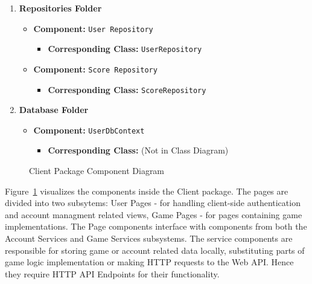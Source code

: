 \documentclass[11pt,a4paper]{article}
\newcommand{\inputdiagram}[1]{}
\begin{document}
\begin{enumerate}[label=\textbf{\arabic*.}, ref=\arabic*]
\begin{enumerate}[label=\textbf{\alph*.}, ref=\theenumi.\alph*]
\begin{itemize}
\begin{itemize}
                        \end{itemize}
                \end{itemize}
        \end{enumerate}
    \item \textbf{Repositories Folder}
        \begin{itemize}
            \item \textbf{Component:} \texttt{User Repository}
                \begin{itemize}
                    \item \textbf{Corresponding Class:} \texttt{UserRepository}
                \end{itemize}
            \item \textbf{Component:} \texttt{Score Repository}
                \begin{itemize}
                    \item \textbf{Corresponding Class:} \texttt{ScoreRepository}
                \end{itemize}
        \end{itemize}
    \item \textbf{Database Folder}
        \begin{itemize}
            \item \textbf{Component:} \texttt{UserDbContext}
                \begin{itemize}
                    \item \textbf{Corresponding Class:} (Not in Class Diagram)
                \end{itemize}
        \end{itemize}
\end{enumerate}

\begin{figure}[H]
    \centering
     \begin{adjustbox}{width=0.92\paperwidth,center}
         \inputdiagram{client_components.tex}
     \end{adjustbox}
    \caption{Client Package Component Diagram}
    \label{fig:client_components}
\end{figure}

Figure~\ref{fig:client_components} visualizes the components inside the Client package.  The pages
are divided into two subsytems: User Pages - for handling client-side
authentication and account managment related views, Game Pages - for pages
containing game implementations. The Page components interface with components
from both the Account Services and Game Services subsystems.  The service
components are responsible for storing game or account related data locally,
substituting parts of game logic implementation or making HTTP requests to
the Web API. Hence they require HTTP API Endpoints for their functionality.
\end{document}
